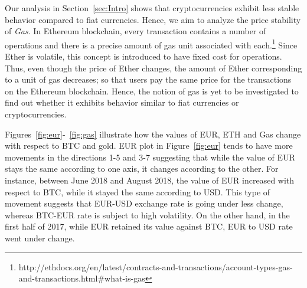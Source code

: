 



 \par
Our analysis in Section~\ref{sec:Intro} shows that cryptocurrencies exhibit less stable behavior compared to fiat currencies. Hence, we aim to analyze the price stability of \emph{Gas}. In Ethereum blockchain, every transaction contains a number of operations and there is a precise amount of gas unit associated with each.\footnote{http://ethdocs.org/en/latest/contracts-and-transactions/account-types-gas-and-transactions.html\#what-is-gas} Since Ether is volatile, this concept is introduced to have fixed cost for operations. Thus, even though the price of Ether changes, the amount of Ether corresponding to a unit of gas decreases; so that users pay the same price for the transactions on the Ethereum blockchain. Hence, the notion of gas is yet to be investigated to find out whether it exhibits behavior similar to fiat currencies or cryptocurrencies.






Figures~\ref{fig:eur}-~\ref{fig:gas} illustrate how the values of EUR, ETH and Gas change with respect to BTC and gold. EUR plot in Figure~\ref{fig:eur} tends to have more movements in the directions 1-5 and 3-7 suggesting that while the value of EUR stays the same according to one axis, it changes according to the other. For instance, between June 2018 and August 2018, the value of EUR increased with respect to BTC, while it stayed the same according to USD. This type of movement suggests that EUR-USD exchange rate is going under less change, whereas BTC-EUR rate is subject to high volatility. On the other hand, in the first half of 2017, while EUR retained its value against BTC, EUR to USD rate went under change.

